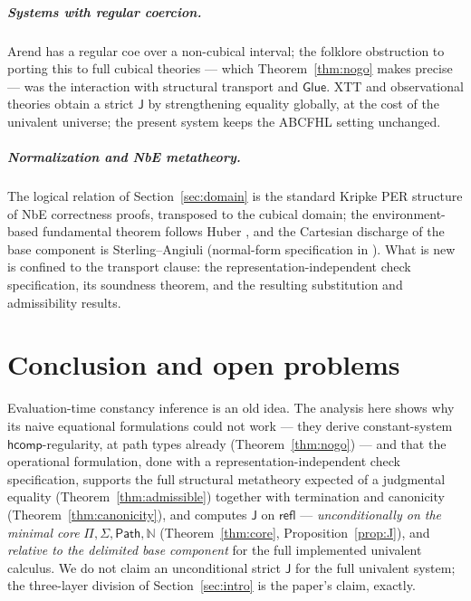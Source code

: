 \documentclass{lmcs}
\newcommand{\hcomp}{\mathsf{hcomp}}
\newcommand{\refl}{\mathsf{refl}}
\newcommand{\J}{\mathsf{J}}
\newcommand{\Glue}{\mathsf{Glue}}
\newcommand{\Path}{\mathsf{Path}}
\begin{document}
\subparagraph*{Systems with regular coercion.}  Arend \cite{Arend}
has a regular \textsf{coe} over a non-cubical interval; the folklore
obstruction to porting this to full cubical theories --- which
Theorem~\ref{thm:nogo} makes precise --- was the interaction with
structural transport and $\Glue$.  XTT and observational theories
\cite{StickyXTT} obtain a strict $\J$ by strengthening equality
globally, at the cost of the univalent universe; the present system
keeps the ABCFHL setting unchanged.

\subparagraph*{Normalization and NbE metatheory.}  The logical
relation of Section~\ref{sec:domain} is the standard Kripke PER
structure of NbE correctness proofs, transposed to the cubical
domain; the environment-based fundamental theorem follows Huber
\cite{HuberNorm}, and the Cartesian discharge of the base component
is Sterling--Angiuli \cite{SterlingAngiuli} (normal-form
specification in \cite{HuangNF}).  What is new is confined to the
transport clause: the representation-independent check specification,
its soundness theorem, and the resulting substitution and
admissibility results.

\section{Conclusion and open problems}
\label{sec:conclusion}

Evaluation-time constancy inference is an old idea.  The analysis
here shows why its naive equational formulations could not work ---
they derive constant-system $\hcomp$-regularity, at path types
already (Theorem~\ref{thm:nogo}) --- and that the operational
formulation, done with a representation-independent check
specification, supports the full structural metatheory expected of a
judgmental equality (Theorem~\ref{thm:admissible}) together with
termination and canonicity (Theorem~\ref{thm:canonicity}), and
computes $\J$ on $\refl$ --- \emph{unconditionally on the minimal
core} $\Pi, \Sigma, \Path, \mathbb{N}$
(Theorem~\ref{thm:core}, Proposition~\ref{prop:J}), and
\emph{relative to the delimited base component} for the full
implemented univalent calculus.  We do not claim an unconditional
strict $\J$ for the full univalent system; the three-layer division
of Section~\ref{sec:intro} is the paper's claim, exactly.
\end{document}
